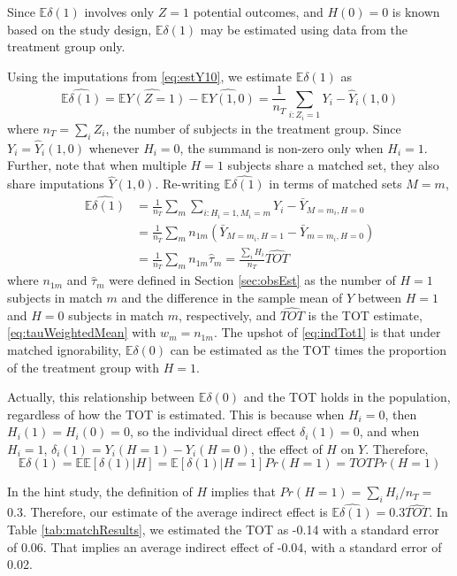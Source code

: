 \documentclass{article}\usepackage[]{graphicx}\usepackage[]{color}
\newcommand{\EE}{\mathbb{E}}
\begin{document}
Since $\EE \delta(1)$ involves only $Z=1$ potential outcomes, and
$H(0)=0$ is known based on the study design, $\EE\delta(1)$ may be
estimated using data from the treatment group only.

Using the imputations from \eqref{eq:estY10}, we estimate
$\EE\delta(1)$ as
\begin{equation*}
\widehat{\EE\delta(1)}=\widehat{\EE Y(Z=1)}-\widehat{\EE
  Y(1,0)}=\frac{1}{n_T}\displaystyle\sum_{i:Z_i=1} Y_i-\hat{Y}_i(1,0)
\end{equation*}
where $n_T=\sum_i Z_i$, the number of subjects in the treatment
group.
Since $Y_i=\hat{Y}_i(1,0)$ whenever $H_i=0$, the summand is non-zero
only when $H_i=1$.
Further, note that when multiple $H=1$ subjects share a
matched set, they also share imputations $\hat{Y}(1,0)$.
Re-writing $\widehat{\EE\delta(1)}$ in terms of matched sets $M=m$,
\begin{align}
\widehat{\EE\delta(1)}&=\frac{1}{n_T}\displaystyle\sum_m\displaystyle\sum_{i:H_i=1,M_i=m}
                        Y_i-\bar{Y}_{M=m_i,H=0} \nonumber \\
&=\frac{1}{n_T}\displaystyle\sum_m
  n_{1m}(\bar{Y}_{M=m_i,H=1}-\bar{Y}_{m=m_i,H=0}) \nonumber \\
&=\frac{1}{n_T}\displaystyle\sum_mn_{1m}\hat{\tau}_m=\frac{\sum_iH_i}{n_T}\widehat{TOT} \label{eq:indTot1}
\end{align}
where $n_{1m}$ and $\hat{\tau}_m$ were defined in Section
\ref{sec:obsEst} as the number of $H=1$ subjects in match $m$ and the
difference in the sample mean of $Y$ between $H=1$ and $H=0$ subjects
in match $m$, respectively, and $\widehat{TOT}$ is the TOT estimate,
\eqref{eq:tauWeightedMean} with $w_m=n_{1m}$.
The upshot of \eqref{eq:indTot1} is that under matched ignorability,
$\EE\delta(0)$ can be estimated as the TOT times the proportion of the
treatment group with $H=1$.

Actually, this relationship between $\EE\delta(0)$ and the TOT holds
in the population, regardless of how the TOT is estimated.
This is because when $H_i=0$, then $H_i(1)=H_i(0)=0$, so the individual direct effect
$\delta_i(1)=0$, and when $H_i=1$,
 $\delta_i(1)=Y_i(H=1)-Y_i(H=0)$, the effect of $H$ on $Y$.
Therefore,
\begin{equation*}
\EE \delta(1)=\EE\EE[\delta(1)|H]=\EE[\delta(1)|H=1]Pr(H=1)=TOTPr(H=1)
\end{equation*}

In the hint study, the definition of $H$ implies that
$Pr(H=1)=\sum_iH_i/n_T=$0.3.
Therefore, our estimate of the average indirect effect is
$\widehat{\EE \delta(1)}=$0.3$\widehat{TOT}$.
In Table \ref{tab:matchResults}, we estimated the TOT as
-0.14 with a
standard error of 0.06.
That implies an average indirect effect of -0.04, with
a standard error of 0.02.
\end{document}
